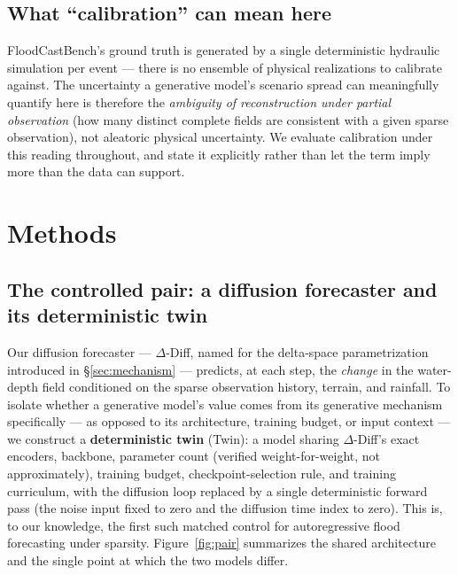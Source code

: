 \documentclass[11pt]{article}
\newcommand{\ours}{\mbox{$\Delta$-Diff}}       %
\newcommand{\twin}{\mbox{Twin}}                 %
\begin{document}
\subsection{What ``calibration'' can mean here}
\label{sec:calibmeaning}
FloodCastBench's ground truth is generated by a single deterministic
hydraulic simulation per event --- there is no ensemble of physical
realizations to calibrate against. The uncertainty a generative model's
scenario spread can meaningfully quantify here is therefore the
\emph{ambiguity of reconstruction under partial observation} (how many
distinct complete fields are consistent with a given sparse observation),
not aleatoric physical uncertainty. We evaluate calibration under this
reading throughout, and state it explicitly rather than let the term imply
more than the data can support.

\section{Methods}
\label{sec:methods}

\subsection{The controlled pair: a diffusion forecaster and its deterministic twin}
\label{sec:twin}
Our diffusion forecaster --- \ours{}, named for the delta-space
parametrization introduced in \S\ref{sec:mechanism} --- predicts, at each
step, the \emph{change} in the water-depth field conditioned on the sparse
observation history, terrain, and rainfall. To isolate whether a
generative model's value comes from its generative mechanism specifically
--- as opposed to its architecture, training budget, or input context ---
we construct a \textbf{deterministic twin} (\twin{}): a model sharing
\ours{}'s exact encoders, backbone, parameter count (verified weight-for-weight,
not approximately), training budget, checkpoint-selection rule, and
training curriculum, with the diffusion loop replaced by a single
deterministic forward pass (the noise input fixed to zero and the
diffusion time index to zero). This is, to our knowledge, the first such
matched control for autoregressive flood forecasting under sparsity.
Figure~\ref{fig:pair} summarizes the shared architecture and the single
point at which the two models differ.
\end{document}
